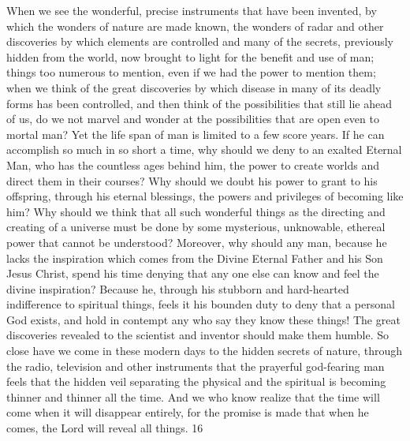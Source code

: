 When we see the wonderful, precise instruments that have been invented, by which the
wonders of nature are made known, the wonders of radar and other discoveries by which
elements are controlled and many of the secrets, previously hidden from the world, now
brought to light for the benefit and use of man; things too numerous to mention, even if we
had the power to mention them; when we think of the great discoveries by which disease in
many of its deadly forms has been controlled, and then think of the possibilities that still lie
ahead of us, do we not marvel and wonder at the possibilities that are open even to mortal
man? Yet the life span of man is limited to a few score years. If he can accomplish so much
in so short a time, why should we deny to an exalted Eternal Man, who has the countless ages
behind him, the power to create worlds and direct them in their courses? Why should we
doubt his power to grant to his offspring, through his eternal blessings, the powers and
privileges of becoming like him? Why should we think that all such wonderful things as the
directing and creating of a universe must be done by some mysterious, unknowable, ethereal
power that cannot be understood? Moreover, why should any man, because he lacks the
inspiration which comes from the Divine Eternal Father and his Son Jesus Christ, spend his
time denying that any one else can know and feel the divine inspiration? Because he, through
his stubborn and hard-hearted indifference to spiritual things, feels it his bounden duty to
deny that a personal God exists, and hold in contempt any who say they know these things!
The great discoveries revealed to the scientist and inventor should make them humble. So
close have we come in these modern days to the hidden secrets of nature, through the radio,
television and other instruments that the prayerful god-fearing man feels that the hidden veil
separating the physical and the spiritual is becoming thinner and thinner all the time. And we
who know realize that the time will come when it will disappear entirely, for the promise is
made that when he comes, the Lord will reveal all things. 16

